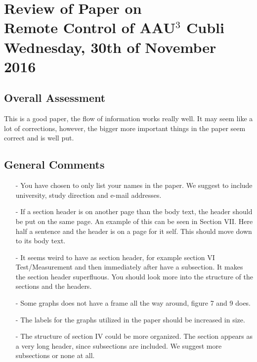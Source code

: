 
\renewcommand{\vec}[1]{\boldsymbol{\mathbf{#1}}}

\renewcommand\chaptername{KAPITEL}
\renewcommand\contentsname{Indhold}
\renewcommand\figurename{Figur}
\renewcommand\tablename{Tabel}

\section*{Review of Paper on\\
Remote Control of AAU$^3$ Cubli\\
\small Wednesday, 30th of November 2016}
\subsection{Overall Assessment}
This is a good paper, the flow of information works really well. It may seem like a lot of corrections, however, the bigger more important things in the paper seem correct and is well put.
\subsection{General Comments}
\begin{itemize}
\item[-]You have chosen to only list your names in the paper. We suggest to include university, study direction and e-mail addresses. 

	\item[-]If a section header is on another page than the body text, the header should be put on the same page. An example of this can be seen in Section VII. Here half a sentence and the header is on a page for it self. This should move down to its body text. 
	\item[-]It seems weird to have as section header, for example section VI Test/Measurement and then immediately after have a subsection. It makes the section header superfluous. You should look more into the structure of the sections and the headers.

\item[-]Some graphs does not have a frame all the way around, figure 7 and 9 does.

\item[-]The labels for the graphs utilized in the paper should be increased in size.

\item[-]The structure of section IV could be more organized. The section appears as a very long header, since subsections are included. We suggest more subsections or none at all.

\end{itemize}	
